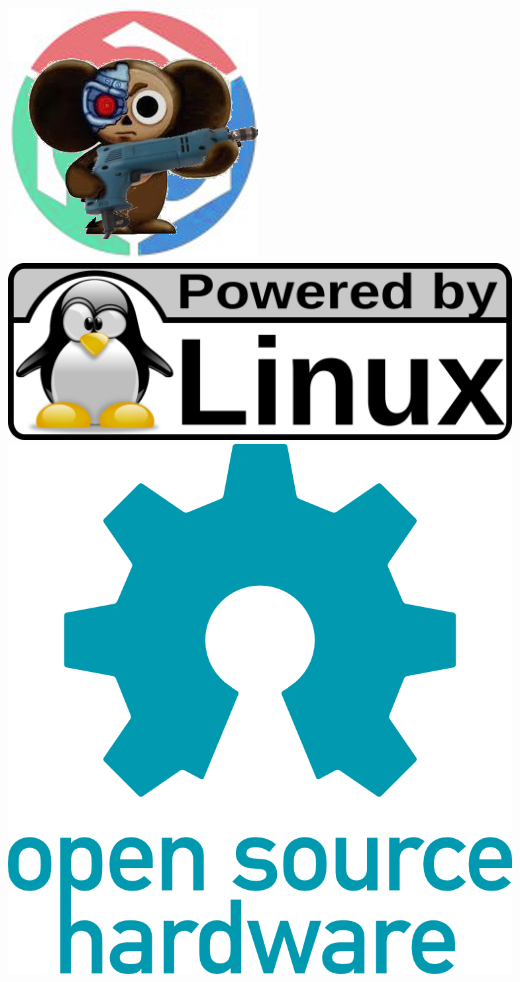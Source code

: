 \begin{titlepage}

\noindent
\includegraphics[height=0.4\textheight]{logo/CHBZ.png}
\hspace{1cm}
\includegraphics[height=0.15\textheight]{logo/LinuxPowered.png}
\hspace{1cm}
\includegraphics[height=0.4\textheight]{logo/OpenHardware.png}


\end{titlepage}
